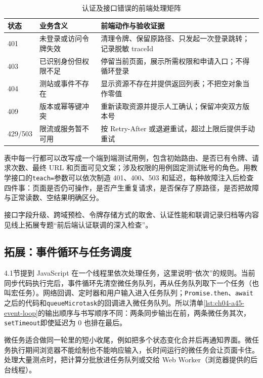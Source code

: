 \begin{table}[htbp]
\centering
\caption{认证及接口错误的前端处理矩阵}
\label{tab:ch04-auth-errors}
\begin{tabular}{p{}p{}p{}}
\toprule
状态 & 业务含义 & 前端动作与验收证据 \\
\midrule
401 & 未登录或访问令牌失效 & 清理令牌、保留原路径、只发起一次登录跳转；记录脱敏 traceId \\
403 & 已识别身份但权限不足 & 停留当前页面，展示所需权限和申请入口；不得循环登录 \\
404 & 测站或事件不存在 & 显示资源不存在并提供返回列表；不把空对象当作零值 \\
409 & 版本或幂等键冲突 & 重新读取资源并提示人工确认；保留冲突双方版本号 \\
429/503 & 限流或服务暂不可用 & 按 Retry-After 或退避重试，超过上限后提供手动重试 \\
\bottomrule
\end{tabular}
\end{table}

表中每一行都可以改写成一个端到端测试用例，包含初始路由、是否已有令牌、请求次数、最终 URL 和页面可见文案；涉及权限的用例固定测试账号的角色。用教学接口的\texttt{teach=}参数可以依次制造 401、400、503 和延迟，每种故障注入后检查四件事：页面是否仍可操作，是否产生重复请求，是否保存了原路径，是否把故障与正常读数、空结果明确区分。

接口字段升级、跨域预检、令牌存储方式的取舍、认证性能和联调记录归档等内容见线上拓展专题“前后端认证联调的深入检查”。

\subsection{拓展：事件循环与任务调度}

4.1节提到 JavaScript 在一个线程里依次处理任务，这里说明“依次”的规则。当前同步代码执行完后，事件循环先清空微任务队列，再从任务队列取下一个任务（也叫宏任务）。网络回调、定时器和用户输入进入任务队列；\texttt{Promise.then}、\texttt{await}之后的代码和\texttt{queueMicrotask}的回调进入微任务队列。所以清单\ref{lst:ch04-a45-event-loop}的输出顺序与书写顺序不同：两条同步输出在前，两条微任务其次，\texttt{setTimeout}即使延迟为 0 也排在最后。

微任务适合做同一轮里的短小收尾，例如把多个状态变化合并后再通知界面。微任务执行期间浏览器不能绘制也不能响应输入，长时间运行的微任务会让页面卡住。处理大量测点时，把计算分批放进任务队列或交给 Web Worker（浏览器提供的后台线程）。

